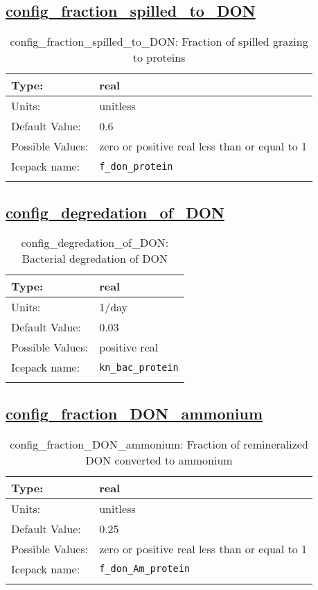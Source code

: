 \subsection[config\_fraction\_spilled\_to\_DON]{\hyperref[sec:nm_tab_biogeochemistry]{config\_fraction\_spilled\_to\_DON}}
\label{subsec:nm_sec_config_fraction_spilled_to_DON}
\begin{center}
\begin{longtable}{| p{2.0in} || p{4.0in} |}
    \hline
    Type: & real \\
    \hline
    Units: & \si{unitless} \\
    \hline
    Default Value: & 0.6 \\
    \hline
    Possible Values: & zero or positive real less than or equal to 1 \\
    \hline
    Icepack name: & \verb+f_don_protein+ \\
    \hline
    \caption{config\_fraction\_spilled\_to\_DON: Fraction of spilled grazing to proteins}
\end{longtable}
\end{center}
\subsection[config\_degredation\_of\_DON]{\hyperref[sec:nm_tab_biogeochemistry]{config\_degredation\_of\_DON}}
\label{subsec:nm_sec_config_degredation_of_DON}
\begin{center}
\begin{longtable}{| p{2.0in} || p{4.0in} |}
    \hline
    Type: & real \\
    \hline
    Units: & \si{1/day} \\
    \hline
    Default Value: & 0.03 \\
    \hline
    Possible Values: & positive real \\
    \hline
    Icepack name: & \verb+kn_bac_protein+ \\
    \hline
    \caption{config\_degredation\_of\_DON: Bacterial degredation of DON}
\end{longtable}
\end{center}
\subsection[config\_fraction\_DON\_ammonium]{\hyperref[sec:nm_tab_biogeochemistry]{config\_fraction\_DON\_ammonium}}
\label{subsec:nm_sec_config_fraction_DON_ammonium}
\begin{center}
\begin{longtable}{| p{2.0in} || p{4.0in} |}
    \hline
    Type: & real \\
    \hline
    Units: & \si{unitless} \\
    \hline
    Default Value: & 0.25 \\
    \hline
    Possible Values: & zero or positive real less than or equal to 1 \\
    \hline
    Icepack name: & \verb+f_don_Am_protein+ \\
    \hline
    \caption{config\_fraction\_DON\_ammonium: Fraction of remineralized DON converted to ammonium}
\end{longtable}
\end{center}
